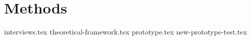 
\chapter{Methods}

{interviews.tex}
{theoretical-framework.tex}
{prototype.tex}
{new-prototype-test.tex}
